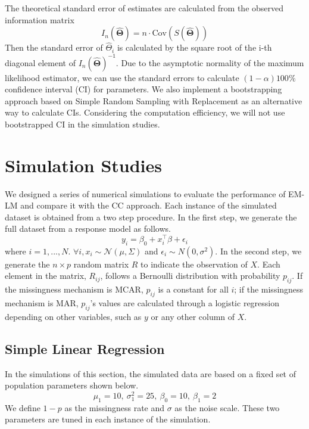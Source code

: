 \documentclass[
  twocolumn]{article}
\begin{document}
The theoretical standard error of estimates are calculated from the
observed information matrix \[ 
I_n (\hat{\boldsymbol{\Theta}}) = n \cdot \mathrm{Cov}(S(\hat{\boldsymbol{\Theta}}))
\] Then the standard error of \(\hat\Theta_i\) is calculated by the
square root of the i-th diagonal element of
\(I_n(\hat{\boldsymbol{\Theta}})^{-1}\). Due to the asymptotic normality
of the maximum likelihood estimator, we can use the standard errors to
calculate \((1-\alpha)100\%\) confidence interval (CI) for parameters.
We also implement a bootstrapping approach based on Simple Random
Sampling with Replacement as an alternative way to calculate CIs.
Considering the computation efficiency, we will not use bootstrapped CI
in the simulation studies.

\hypertarget{simulation-studies}{%
\section{Simulation Studies}\label{simulation-studies}}

We designed a series of numerical simulations to evaluate the
performance of EM-LM and compare it with the CC approach. Each instance
of the simulated dataset is obtained from a two step procedure. In the
first step, we generate the full dataset from a response model as
follows. \[
y_i = \beta_0 + x_{i}^{\top}\beta + \epsilon_i
\] where \(i = 1,...,N\).
\(\forall i, x_i \sim \mathcal{N}(\mu, \Sigma)\) and
\(\epsilon_i \sim N(0, \sigma^2)\). In the second step, we generate the
\(n \times p\) random matrix \(R\) to indicate the observation of \(X\).
Each element in the matrix, \(R_{ij}\), follows a Bernoulli distribution
with probability \(p_{ij}\). If the missingness mechanism is MCAR,
\(p_{ij}\) is a constant for all \(i\); if the missingness mechanism is
MAR, \(p_{ij}\)'s values are calculated through a logistic regression
depending on other variables, such as \(y\) or any other column of
\(X\).

\hypertarget{simple-linear-regression}{%
\subsection{Simple Linear Regression}\label{simple-linear-regression}}

In the simulations of this section, the simulated data are based on a
fixed set of population parameters shown below. \[
\mu_1 = 10,~\sigma_{1}^{2} = 25,~\beta_0 = 10,~\beta_1 = 2
\] We define \(1 - p\) as the missingness rate and \(\sigma\) as the
noise scale. These two parameters are tuned in each instance of the
simulation.
\end{document}
